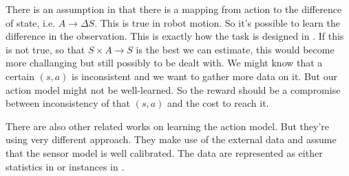 \documentclass[10pt]{article}
\begin{document}
There is an assumption in \cite{CSJ06} that there is a mapping from
action to the difference of state, i.e. $A \rightarrow \Delta S$. This
is true in robot motion. So it's possible to learn the difference in
the observation. This is exactly how the task is designed in
\cite{ICDL10-hester}. If this is not true, so that $S \times A
\rightarrow S$ is the best we can estimate, this would become more
challanging but still possibly to be dealt with. We might know that a
certain $(s, a)$ is inconsistent and we want to gather more data on
it. But our action model might not be well-learned. So the reward
should be a compromise between inconsistency of that $(s, a)$ and the
cost to reach it.

There are also other related works on learning the action model. But
they're using very different approach. They make use of the external
data and assume that the sensor model is well calibrated. The data are
represented as either statistics in \cite{And_learningand} or
instances in \cite{LNAI2007-ahmadi}.




\end{document}
